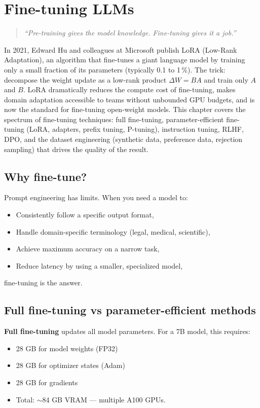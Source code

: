 \chapter{Fine-tuning LLMs}
\label{ch:finetuning}

\begin{quote}
\emph{``Pre-training gives the model knowledge. Fine-tuning gives it a job.''}
\end{quote}

In 2021, Edward Hu and colleagues at Microsoft publish LoRA (Low-Rank Adaptation), an algorithm that fine-tunes a giant language model by training only a small fraction of its parameters (typically 0.1 to 1\,\%). The trick: decompose the weight update as a low-rank product $\Delta W = BA$ and train only $A$ and $B$. LoRA dramatically reduces the compute cost of fine-tuning, makes domain adaptation accessible to teams without unbounded GPU budgets, and is now the standard for fine-tuning open-weight models. This chapter covers the spectrum of fine-tuning techniques: full fine-tuning, parameter-efficient fine-tuning (LoRA, adapters, prefix tuning, P-tuning), instruction tuning, RLHF, DPO, and the dataset engineering (synthetic data, preference data, rejection sampling) that drives the quality of the result.

\section{Why fine-tune?}

Prompt engineering has limits. When you need a model to:
\begin{itemize}
  \item Consistently follow a specific output format,
  \item Handle domain-specific terminology (legal, medical, scientific),
  \item Achieve maximum accuracy on a narrow task,
  \item Reduce latency by using a smaller, specialized model,
\end{itemize}
fine-tuning is the answer.

\section{Full fine-tuning vs parameter-efficient methods}

\textbf{Full fine-tuning} updates all model parameters. For a 7B model, this requires:
\begin{itemize}
  \item 28 GB for model weights (FP32)
  \item 28 GB for optimizer states (Adam)
  \item 28 GB for gradients
  \item Total: $\sim$84 GB VRAM --- multiple A100 GPUs.
\end{itemize}


